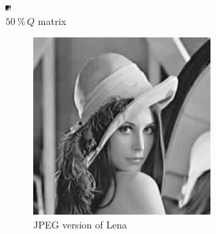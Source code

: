 \documentclass[12pt,english]{article}
\begin{document}
\begin{figure}
	\centering
	\includegraphics[width=.4\textwidth]{img/Q}
	\caption{$\SI{50}{\percent}\, Q$ matrix}
	\label{fig:Q}
\end{figure}

\begin{figure}
	\centering
	\begin{subfigure}[t]{0.3\textwidth}
		\centering
		\includegraphics[width=.9\textwidth]{img/lenaJPEG}
		\caption{JPEG version of Lena}
		\label{fig:jlena}
	\end{subfigure}%
	\quad%
	\begin{subfigure}[t]{0.3\textwidth}
		\centering

\end{subfigure}
\end{figure}
\end{document}
